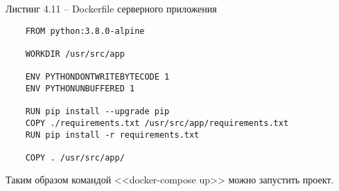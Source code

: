 Листинг 4.11 – Dockerfile серверного приложения
\begin{lstlisting}
    FROM python:3.8.0-alpine

    WORKDIR /usr/src/app

    ENV PYTHONDONTWRITEBYTECODE 1
    ENV PYTHONUNBUFFERED 1

    RUN pip install --upgrade pip
    COPY ./requirements.txt /usr/src/app/requirements.txt
    RUN pip install -r requirements.txt

    COPY . /usr/src/app/

\end{lstlisting}

Таким образом командой <<docker-compose up>> можно запустить проект.

